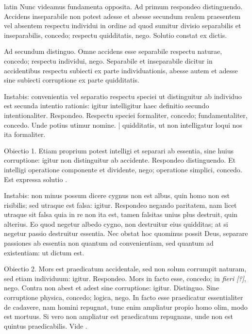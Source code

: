 \begin{otherlanguage*}{latin}
\pstart
  Nunc videamus fundamenta opposita. Ad primum respondeo distinguendo. Accidens inseparabile non potest adesse et abesse secundum realem praesentem vel absentem respectu individui in ordine ad quod sumitur divisio separabilis et inseparabilis, concedo; respectu quidditatis, nego. Solutio constat ex dictis. 
\pend

\pstart
  Ad secundum distinguo. Omne accidens esse separabile respectu naturae, concedo; respectu individui, nego. Separabile et inseparabile dicitur in accidentibus respectu subiecti ex parte individuationis, abesse autem et adesse sine subiecti corruptione ex parte quidditatis. 
\pend

\pstart
  Instabis: convenientia vel separatio respectu speciei ut distinguitur ab individuo est secunda intentio rationis: igitur intelligitur haec definitio secundo intentionaliter. Respondeo. Respectu speciei formaliter, concedo; fundamentaliter, concedo. Unde potius utimur nomine. \textnormal{|} quidditatis, ut non intelligatur loqui nos ita formaliter. 
\pend

\pstart
  Obiectio 1. Etiam proprium potest intelligi et separari ab essentia, sine huius corruptione: igitur non distinguitur ab accidente. Respondeo distinguendo. Et intelligi operatione componente et dividente, nego; operatione simplici, concedo. Est expressa solutio . 
\pend

\pstart
  Instabis: non minus possum dicere cygnus non est albus, quin homo non est risibilis; sed utraque est falsa: igitur. Respondeo negando paritatem, nam licet utraque sit falsa quia in re non ita est, tamen falsitas unius plus destruit, quin alterius. Eo quod negetur albedo cygno, non destruitur eius quidditas; at si negetur passio destruitur essentia. Nec obstat hoc quominus possit Deus, separare passiones ab essentia non quantum ad convenientiam, sed quantum ad existentiam: ut dictum est. 
\pend

\pstart
  Obiectio 2. Mors est praedicatum accidentale, sed non solum corrumpit naturam, sed etiam individuum: igitur. Respondeo. Mors in facto esse, concedo; in \emph{fieri [?]}, nego. Contra non abest et adest sine corruptione: igitur. Distinguo. Sine corruptione physica, concedo; logica, nego. In facto esse praedicatur essentialiter de cadavere, nam homini repugnat, tunc enim ampliatur propio homo olim, modo est mortuus. Si vero non ampliatur est praedicatum repugnans, unde non est quintus praedicabilis. Vide . 
\pend


\end{otherlanguage*}
